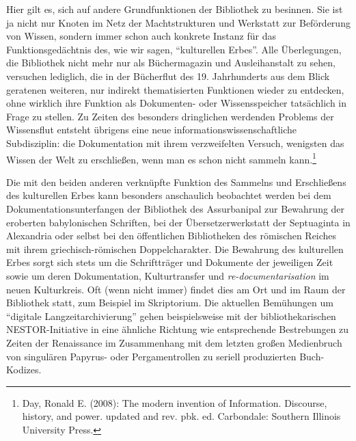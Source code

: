 Hier gilt es, sich auf andere Grundfunktionen der Bibliothek zu
besinnen. Sie ist ja nicht nur Knoten im Netz der Machtstrukturen und
Werkstatt zur Beförderung von Wissen, sondern immer schon auch konkrete
Instanz für das Funktionsgedächtnis des, wie wir sagen,
\enquote{kulturellen Erbes}. Alle Überlegungen, die Bibliothek nicht
mehr nur als Büchermagazin und Ausleihanstalt zu sehen, versuchen
lediglich, die in der Bücherflut des 19. Jahrhunderts aus dem Blick
geratenen weiteren, nur indirekt thematisierten Funktionen wieder zu
entdecken, ohne wirklich ihre Funktion als Dokumenten- oder
Wissensspeicher tatsächlich in Frage zu stellen. Zu Zeiten des besonders
dringlichen werdenden Problems der Wissensflut entsteht übrigens eine
neue informationswissenschaftliche Subdisziplin: die Dokumentation mit
ihrem verzweifelten Versuch, wenigsten das Wissen der Welt zu
erschließen, wenn man es schon nicht sammeln kann.\footnote{Day, Ronald
  E. (2008): The modern invention of Information. Discourse, history,
  and power. updated and rev. pbk. ed. Carbondale: Southern Illinois
  University Press.}

Die mit den beiden anderen verknüpfte Funktion des Sammelns und
Erschließens des kulturellen Erbes kann besonders anschaulich beobachtet
werden bei dem Dokumentationsunterfangen der Bibliothek des Assurbanipal
zur Bewahrung der eroberten babylonischen Schriften, bei der
Übersetzerwerkstatt der Septuaginta in Alexandria oder selbst bei den
öffentlichen Bibliotheken des römischen Reiches mit ihrem
griechisch-römischen Doppelcharakter. Die Bewahrung des kulturellen
Erbes sorgt sich stets um die Schriftträger und Dokumente der jeweiligen
Zeit sowie um deren Dokumentation, Kulturtransfer und
\emph{re-documentarisation} im neuen Kulturkreis. Oft (wenn nicht immer)
findet dies am Ort und im Raum der Bibliothek statt, zum Beispiel im
Skriptorium. Die aktuellen Bemühungen um \enquote{digitale
Langzeitarchivierung} gehen beispielsweise mit der bibliothekarischen
NESTOR-Initiative in eine ähnliche Richtung wie entsprechende
Bestrebungen zu Zeiten der Renaissance im Zusammenhang mit dem letzten
großen Medienbruch von singulären Papyrus- oder Pergamentrollen zu
seriell produzierten Buch-Kodizes.

